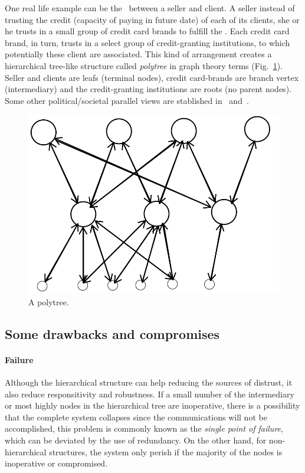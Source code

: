 \documentclass[../main.tex]{subfiles}
\begin{document}
One real life example can be the \EFT\ between a seller and client. A seller instead of trusting the credit (capacity of paying in future date) of each of its clients, she or he trusts in a small group of credit card brands to fulfill the \EFT{}.
Each credit card brand, in turn, trusts in a select group of credit-granting institutions, to which potentially these client are associated.
This kind of arrangement creates a hierarchical tree-like structure called \emph{polytree} in graph theory terms (Fig.~\ref{fig:polytree_topology}). Seller and clients are leafs (terminal nodes), credit card-brands are branch vertex (intermediary) and the credit-granting institutions are roots (no parent nodes).
Some other political/societal parallel views are stablished in~\cite{McNamaraEtAl2018} and~\cite{OlaruEtAl2018}.

\begin{figure}[h]
  \centering
  \includegraphics[width=.4\textwidth]{../img/polytree.png}
  \caption{A polytree.}\label{fig:polytree_topology}
\end{figure}

\subsection{Some drawbacks and compromises}\label{sec:drawbacks}

\paragraph{Failure}
Although the hierarchical structure can help reducing the sources of distrust, it also reduce responsitivity and robustness.
If a small number of the intermediary or most highly nodes in the hierarchical tree are inoperative, there is a possibility that the complete system collapses since the communications will not be accomplished, this problem is commonly known as the \emph{single point of failure}, which can be deviated by the use of redundancy.
On the other hand, for non-hierarchical structures, the system only perish if the majority of the nodes is inoperative or compromised.
\end{document}
